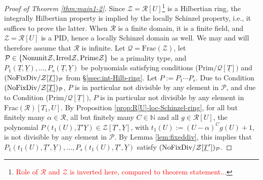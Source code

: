 \documentclass[11pt,a4paper,reqno]{amsart}
\theoremstyle{definition}
\begin{document}
\iffalse
\begin{proof}[Proof of Theorem \ref{thm:main1-2}]
Since $\mathcal{Z}=\mathcal{R}[U]$\footnote{\textcolor{red}{Role of $\mathcal{R}$ and $\mathcal{Z}$ is inverted here, compared to theorem statement...}} is a Hilbertian ring, the integrally Hilbertian property is implied by the locally Schinzel property, i.e., it suffices to prove the latter.
 When ${\mathcal R}$ is a finite domain, it is a finite field, and ${\mathcal Z}={\mathcal R}[U]$ is a PID, hence a locally Schinzel domain as well. We may and will therefore assume that $\mathcal{R}$ is infinite. Let $\mathcal{Q}=\textrm{Frac}(\mathcal{Z})$, let $\mathcal{P}\in \{\rm{Nonunit} \mathcal{Z}, \rm{Irred} \mathcal{Z}, \rm{Prime} \mathcal{Z}\}$ be a primality type, and $P_1(\underline T, \underline Y), \dots, P_s(\underline T,\underline Y)$ be polynomials satisfying conditions {\rm (Prim}$/{\mathcal Q}[\underline T])$ and $\hbox{\rm (NoFixDiv}/{\mathcal Z}[\underline T])_{\mathcal P}$ from \S \ref{ssec:int-Hilb-ring}. Let $P:=P_1\cdots P_s$. Due to Condition $\hbox{\rm (NoFixDiv}/{\mathcal Z}[\underline T])_{\mathcal P}$, $P$ is in particular not divisible by any element in $\mathcal{P}$, and due to Condition {\rm (Prim}$/{\mathcal Q}[\underline T])$, $P$ is in particular not divisible by any element in $\textrm{Frac}(\mathcal{R})[T_1,U]$. By Proposition \ref{prop:R[U]-loc-Schinzel-ring}, for all but finitely many $\alpha\in \mathcal{R}$, all but finitely many $C\in \mathbb{N}$ and all $g\in \mathcal{R}[U]$, the polynomial $P(t_1(U), \underline{T}'\underline{Y})\in \mathcal{Z}[\underline T', \underline{Y}]$, with $t_1(U):=(U-\alpha)^C g(U)+1$, is not divisible by any element in $\mathcal{P}$. By Lemma \ref{lem:fixeddiv}, this implies that $P_1(t_1(U),\underline{T}',\underline{Y}),\dots, P_s(t_1(U), \underline{T}',\underline{Y})$ satisfy $\hbox{\rm (NoFixDiv}/{\mathcal Z}[\underline T'])_{\mathcal P}$.
 

\end{proof}
\end{document}
